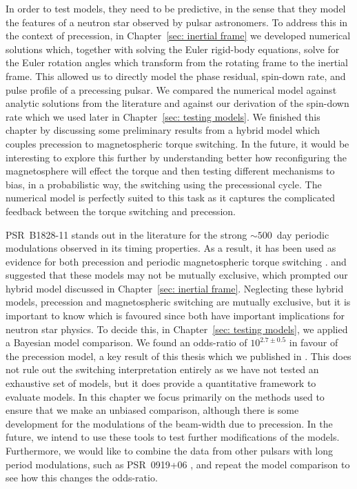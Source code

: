 \documentclass[twoside, 11pt]{thesis}
\begin{document}
In order to test models, they need to be predictive, in the sense that they
model the features of a neutron star observed by pulsar astronomers. To address
this in the context of precession, in Chapter~\ref{sec: inertial frame} we
developed numerical solutions which, together with solving the Euler rigid-body
equations, solve for the Euler rotation angles which transform from the
rotating frame to the inertial frame. This allowed us to directly model the
phase residual, spin-down rate, and pulse profile of a precessing pulsar.
We compared the numerical model against analytic solutions from the literature
and against our derivation of the spin-down rate which we used later in
Chapter~\ref{sec: testing models}. We finished this chapter by discussing some
preliminary results from a hybrid model which couples precession to
magnetospheric torque switching. In the future, it would be interesting to explore
this further by understanding better how reconfiguring the magnetosphere will
effect the \citet{Deutsch1955} torque and then testing different mechanisms to
bias, in a probabilistic way, the switching using the precessional cycle. The
numerical model is perfectly suited to this task as it captures the complicated
feedback between the torque switching  and precession.

PSR~B1828-11 stands out in the literature for the strong $\sim 500$~day
periodic modulations observed in its timing properties. As a result, it has
been used as evidence for both precession \citep{Stairs2000} and periodic
magnetospheric torque switching \citep{Lyne2010}. \citet{Jones2012} and
\citet{Cordes2013} suggested that these models may not be mutually exclusive,
which prompted our hybrid model discussed in Chapter~\ref{sec: inertial frame}.
Neglecting these hybrid models, precession and magnetospheric
switching are mutually exclusive, but it is important to know which is favoured
since both have important implications for neutron star physics. To decide
this, in Chapter~\ref{sec: testing models}, we applied a Bayesian model
comparison. We found an odds-ratio of $10^{2.7\pm 0.5}$ in favour of the
precession model, a key result of this thesis which we published in
\citet{Ashton2016}. This does not rule out the switching interpretation
entirely as we have not tested an exhaustive set of models, but it does provide
a quantitative framework to evaluate models. In this chapter  we focus
primarily on the methods used to ensure that we make an unbiased comparison, although
there is some development for the modulations of the beam-width due to
precession. In the future, we intend to use these tools to test further
modifications of the models. Furthermore, we would like to combine the data
from other pulsars with long period modulations, such as PSR~0919+06
\citep{Perera2015}, and repeat the model comparison to see how this changes the
odds-ratio.
\end{document}
